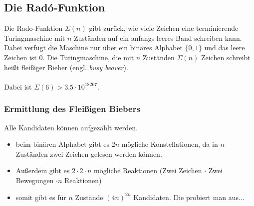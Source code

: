 \documentclass{article}
\begin{document}
\subsection{Die Rad\'o-Funktion}
Die Rado-Funktion $\Sigma(n)$ gibt zur\"uck, wie viele Zeichen eine terminierende Turingmaschine mit $n$ Zuständen auf ein anfangs leeres Band schreiben kann. Dabei verfügt die Maschine nur über ein binäres Alphabet $\{0, 1\}$ und das leere Zeichen ist $0$. Die Turingmaschine, die mit $n$ Zuständen $\Sigma(n)$ Zeichen schreibt heißt fleißiger Bieber (engl. \emph{busy beaver}).\\
\\
Dabei ist $\Sigma(6) > 3.5 \cdot 10^{18267}$.

\subsubsection{Ermittlung des Fleißigen Biebers}

Alle Kandidaten können aufgezählt werden.
\begin{itemize}
    \item beim binären Alphabet gibt es $2n$ mögliche Konstellationen, da in $n$ Zuständen zwei Zeichen gelesen werden können.
    \item Außerdem gibt es $2\cdot2\cdot n$ mögliche Reaktionen (Zwei Zeichen $\cdot$ Zwei Bewegungen $\cdot n$ Reaktionen)
    \item somit gibt es für $n$ Zustände $(4n)^{2n}$ Kandidaten. Die probiert man aus...
\end{itemize}
\end{document}
